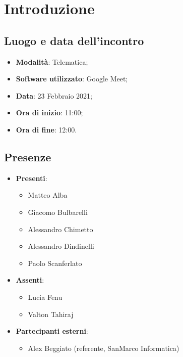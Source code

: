 \documentclass[]{article}
\begin{document}
	

	\newpage


	\section{Introduzione}
		\subsection{Luogo e data dell'incontro}
		\begin{itemize}
			\item \textbf{Modalità}: Telematica;
			\item \textbf{Software utilizzato}: Google Meet;
			\item \textbf{Data}: 23 Febbraio 2021;
			\item \textbf{Ora di inizio}: 11:00;
			\item \textbf{Ora di fine}: 12:00.
		\end{itemize}

		\subsection{Presenze}
		\begin{itemize}
			\item \textbf{Presenti}:
			\begin{itemize}
				\item Matteo Alba
				\item Giacomo Bulbarelli
				\item Alessandro Chimetto
				\item Alessandro Dindinelli
				\item Paolo Scanferlato
			\end{itemize}
			\item \textbf{Assenti}:
			\begin{itemize}
				\item Lucia Fenu
				\item Valton Tahiraj
			\end{itemize}
			\item \textbf{Partecipanti esterni}:
			\begin{itemize}
				\item Alex Beggiato (referente, SanMarco Informatica)
			\end{itemize}
		\end{itemize}
\end{document}

